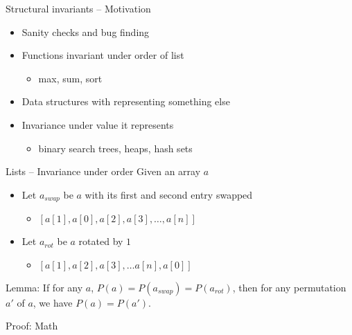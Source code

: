\documentclass[usenames,dvipsnames]{beamer}
\begin{document}
\begin{frame}[fragile]{Structural invariants -- Motivation}
  \begin{itemize}
    \item Sanity checks and bug finding
    \vfill
    \item Functions invariant under order of list
    \begin{itemize}
      \item max, sum, sort
    \end{itemize}
    \vfill
    \item Data structures with representing something else
    \item Invariance under value it represents
    \begin{itemize}
      \item binary search trees, heaps, hash sets
    \end{itemize}
  \end{itemize}
\end{frame}

\begin{frame}[fragile]{Lists -- Invariance under order}
  Given an array $a$
  \begin{itemize}
    \item Let $a_{swap}$ be $a$ with its first and second entry swapped
    \begin{itemize}
      \item $[ a[1], a[0], a[2], a[3], \ldots, a[n] ]$
    \end{itemize}
    \item Let $a_{rot}$ be $a$ rotated by $1$
    \begin{itemize}
      \item $[ a[1], a[2], a[3], \ldots  a[n], a[0] ]$
    \end{itemize}
  \end{itemize}
  \vfill
  Lemma: If for any $a$, $P(a) = P(a_{swap}) = P(a_{rot})$,
  then for any permutation $a'$ of $a$,
  we have $P(a) = P(a')$.

  Proof: Math
\end{frame}
\end{document}
